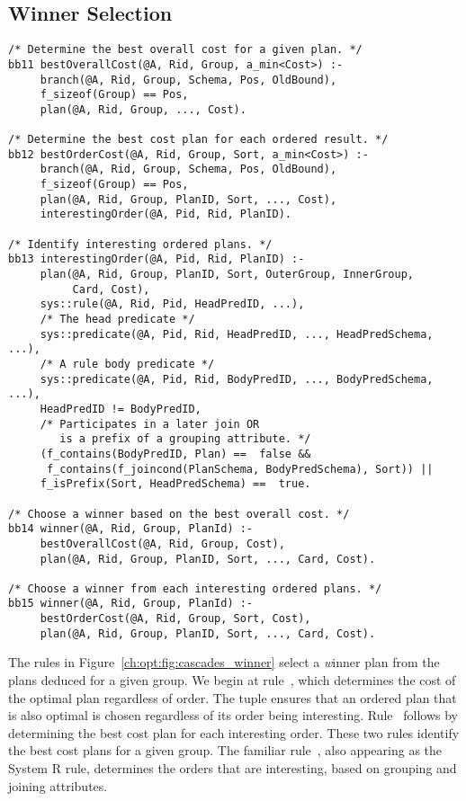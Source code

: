 \subsection{Winner Selection}
\label{ch:opt:sec:cascades_winner}

\begin{figure*}
\ssp
\centering
\begin{lstlisting}
/* Determine the best overall cost for a given plan. */
bb11 bestOverallCost(@A, Rid, Group, a_min<Cost>) :-
     branch(@A, Rid, Group, Schema, Pos, OldBound),
     f_sizeof(Group) == Pos,
     plan(@A, Rid, Group, ..., Cost).

/* Determine the best cost plan for each ordered result. */
bb12 bestOrderCost(@A, Rid, Group, Sort, a_min<Cost>) :-
     branch(@A, Rid, Group, Schema, Pos, OldBound),
     f_sizeof(Group) == Pos,
     plan(@A, Rid, Group, PlanID, Sort, ..., Cost),
     interestingOrder(@A, Pid, Rid, PlanID).

/* Identify interesting ordered plans. */ 
bb13 interestingOrder(@A, Pid, Rid, PlanID) :-
     plan(@A, Rid, Group, PlanID, Sort, OuterGroup, InnerGroup, 
          Card, Cost),
     sys::rule(@A, Rid, Pid, HeadPredID, ...),
     /* The head predicate */
     sys::predicate(@A, Pid, Rid, HeadPredID, ..., HeadPredSchema, ...),
     /* A rule body predicate */
     sys::predicate(@A, Pid, Rid, BodyPredID, ..., BodyPredSchema, ...),
     HeadPredID != BodyPredID, 
     /* Participates in a later join OR 
        is a prefix of a grouping attribute. */
     (f_contains(BodyPredID, Plan) ==  false &&
      f_contains(f_joincond(PlanSchema, BodyPredSchema), Sort)) ||
     f_isPrefix(Sort, HeadPredSchema) ==  true.

/* Choose a winner based on the best overall cost. */
bb14 winner(@A, Rid, Group, PlanId) :-
     bestOverallCost(@A, Rid, Group, Cost),
     plan(@A, Rid, Group, PlanID, Sort, ..., Card, Cost).

/* Choose a winner from each interesting ordered plans. */
bb15 winner(@A, Rid, Group, PlanId) :-
     bestOrderCost(@A, Rid, Group, Sort, Cost),
     plan(@A, Rid, Group, PlanID, Sort, ..., Card, Cost).
\end{lstlisting}
\caption{\label{ch:opt:fig:cascades_winner} Cascades winner selection rules.}
\end{figure*}

The rules in Figure~\ref{ch:opt:fig:cascades_winner} select a {\emph winner}
plan from the plans deduced for a given group.  We begin at rule~,
which determines the cost of the optimal plan regardless of order.  The
 tuple ensures that an ordered plan that is also optimal is
chosen regardless of its order being interesting.  Rule~ follows by
determining the best cost plan for each interesting order.  These two rules
identify the best cost plans for a given group.  The familiar rule~,
also appearing as the  System R rule, determines the orders that are
interesting, based on grouping and joining attributes.

